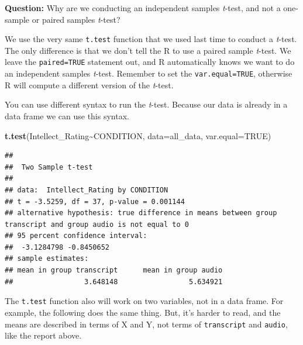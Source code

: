 \documentclass[
]{book}
\newenvironment{Shaded}{\begin{snugshade}}{\end{snugshade}}
\newcommand{\AttributeTok}[1]{\textcolor[rgb]{0.13,0.29,0.53}{#1}}
\newcommand{\ConstantTok}[1]{\textcolor[rgb]{0.56,0.35,0.01}{#1}}
\newcommand{\FunctionTok}[1]{\textcolor[rgb]{0.13,0.29,0.53}{\textbf{#1}}}
\newcommand{\NormalTok}[1]{#1}
\newcommand{\SpecialCharTok}[1]{\textcolor[rgb]{0.81,0.36,0.00}{\textbf{#1}}}
\newcommand{\StringTok}[1]{\textcolor[rgb]{0.31,0.60,0.02}{#1}}
\begin{document}
\textbf{Question:} Why are we conducting an independent samples \emph{t}-test, and not a one-sample or paired samples \emph{t}-test?

We use the very same \texttt{t.test} function that we used last time to conduct a \emph{t}-test. The only difference is that we don't tell the R to use a paired sample \emph{t}-test. We leave the \texttt{paired=TRUE} statement out, and R automatically knows we want to do an independent samples \emph{t}-test. Remember to set the \texttt{var.equal=TRUE}, otherwise R will compute a different version of the \emph{t}-test.

You can use different syntax to run the \emph{t}-test. Because our data is already in a data frame we can use this syntax.

\begin{Shaded}
\begin{Highlighting}[]
\FunctionTok{t.test}\NormalTok{(Intellect\_Rating}\SpecialCharTok{\textasciitilde{}}\NormalTok{CONDITION, }\AttributeTok{data=}\NormalTok{all\_data, }\AttributeTok{var.equal=}\ConstantTok{TRUE}\NormalTok{)}
\end{Highlighting}
\end{Shaded}

\begin{verbatim}
## 
##  Two Sample t-test
## 
## data:  Intellect_Rating by CONDITION
## t = -3.5259, df = 37, p-value = 0.001144
## alternative hypothesis: true difference in means between group transcript and group audio is not equal to 0
## 95 percent confidence interval:
##  -3.1284798 -0.8450652
## sample estimates:
## mean in group transcript      mean in group audio 
##                 3.648148                 5.634921
\end{verbatim}

The \texttt{t.test} function also will work on two variables, not in a data frame. For example, the following does the same thing. But, it's harder to read, and the means are described in terms of X and Y, not terms of \texttt{transcript} and \texttt{audio}, like the report above.

\begin{Shaded}
\end{Shaded}
\end{document}
